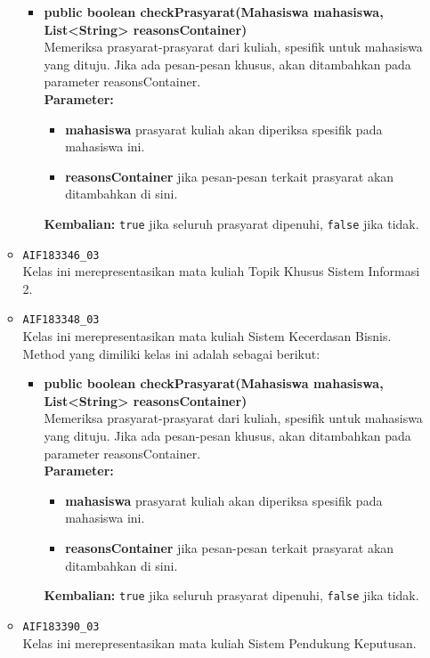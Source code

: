 \begin{enumerate}
\begin{itemize}
		\begin{itemize}
			\item \textbf{public boolean checkPrasyarat(Mahasiswa mahasiswa, List<String> reasonsContainer)}\\
			Memeriksa prasyarat-prasyarat dari kuliah, spesifik untuk mahasiswa yang dituju. Jika ada pesan-pesan khusus, akan ditambahkan pada parameter reasonsContainer.\\
			\textbf{Parameter:}
			\begin{itemize}
				\item \textbf{mahasiswa} prasyarat kuliah akan diperiksa spesifik pada mahasiswa ini.
				\item \textbf{reasonsContainer} jika pesan-pesan terkait prasyarat akan ditambahkan di sini.
			\end{itemize}
			\textbf{Kembalian:} \texttt{true} jika seluruh prasyarat dipenuhi, \texttt{false} jika tidak.
		\end{itemize}
		\item \texttt{AIF183346\_03} \\
		Kelas ini merepresentasikan mata kuliah Topik Khusus Sistem Informasi 2.
		\item \texttt{AIF183348\_03} \\
		Kelas ini merepresentasikan mata kuliah Sistem Kecerdasan Bisnis. Method yang dimiliki kelas ini adalah sebagai berikut: 
		\begin{itemize}
			\item \textbf{public boolean checkPrasyarat(Mahasiswa mahasiswa, List<String> reasonsContainer)}\\
			Memeriksa prasyarat-prasyarat dari kuliah, spesifik untuk mahasiswa yang dituju. Jika ada pesan-pesan khusus, akan ditambahkan pada parameter reasonsContainer.\\
			\textbf{Parameter:}
			\begin{itemize}
				\item \textbf{mahasiswa} prasyarat kuliah akan diperiksa spesifik pada mahasiswa ini.
				\item \textbf{reasonsContainer} jika pesan-pesan terkait prasyarat akan ditambahkan di sini.
			\end{itemize}
			\textbf{Kembalian:} \texttt{true} jika seluruh prasyarat dipenuhi, \texttt{false} jika tidak.
		\end{itemize}
		\item \texttt{AIF183390\_03} \\
		Kelas ini merepresentasikan mata kuliah Sistem Pendukung Keputusan.

\end{itemize}
\end{enumerate}
